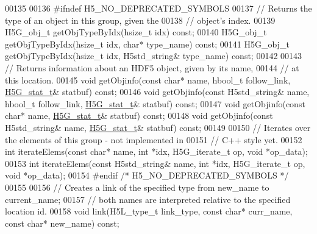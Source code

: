 \begin{DoxyCode}
00135 
00136 \textcolor{preprocessor}{#ifndef H5\_NO\_DEPRECATED\_SYMBOLS}
00137         \textcolor{comment}{// Returns the type of an object in this group, given the}
00138         \textcolor{comment}{// object's index.}
00139         H5G\_obj\_t getObjTypeByIdx(hsize\_t idx) \textcolor{keyword}{const};
00140         H5G\_obj\_t getObjTypeByIdx(hsize\_t idx, \textcolor{keywordtype}{char}* type\_name) \textcolor{keyword}{const};
00141         H5G\_obj\_t getObjTypeByIdx(hsize\_t idx, H5std\_string& type\_name) \textcolor{keyword}{const};
00142 
00143         \textcolor{comment}{// Returns information about an HDF5 object, given by its name,}
00144         \textcolor{comment}{// at this location.}
00145         \textcolor{keywordtype}{void} getObjinfo(\textcolor{keyword}{const} \textcolor{keywordtype}{char}* name, hbool\_t follow\_link, \hyperlink{struct_h5_g__stat__t}{H5G\_stat\_t}& statbuf) \textcolor{keyword}{const};
00146         \textcolor{keywordtype}{void} getObjinfo(\textcolor{keyword}{const} H5std\_string& name, hbool\_t follow\_link, 
      \hyperlink{struct_h5_g__stat__t}{H5G\_stat\_t}& statbuf) \textcolor{keyword}{const};
00147         \textcolor{keywordtype}{void} getObjinfo(\textcolor{keyword}{const} \textcolor{keywordtype}{char}* name, \hyperlink{struct_h5_g__stat__t}{H5G\_stat\_t}& statbuf) \textcolor{keyword}{const};
00148         \textcolor{keywordtype}{void} getObjinfo(\textcolor{keyword}{const} H5std\_string& name, \hyperlink{struct_h5_g__stat__t}{H5G\_stat\_t}& statbuf) \textcolor{keyword}{const};
00149 
00150         \textcolor{comment}{// Iterates over the elements of this group - not implemented in}
00151         \textcolor{comment}{// C++ style yet.}
00152         \textcolor{keywordtype}{int} iterateElems(\textcolor{keyword}{const} \textcolor{keywordtype}{char}* name, \textcolor{keywordtype}{int} *idx, H5G\_iterate\_t op, \textcolor{keywordtype}{void} *op\_data);
00153         \textcolor{keywordtype}{int} iterateElems(\textcolor{keyword}{const} H5std\_string& name, \textcolor{keywordtype}{int} *idx, H5G\_iterate\_t op, \textcolor{keywordtype}{void} *op\_data);
00154 \textcolor{preprocessor}{#endif }\textcolor{comment}{/* H5\_NO\_DEPRECATED\_SYMBOLS */}\textcolor{preprocessor}{}
00155 
00156         \textcolor{comment}{// Creates a link of the specified type from new\_name to current\_name;}
00157         \textcolor{comment}{// both names are interpreted relative to the specified location id.}
00158         \textcolor{keywordtype}{void} link(H5L\_type\_t link\_type, \textcolor{keyword}{const} \textcolor{keywordtype}{char}* curr\_name, \textcolor{keyword}{const} \textcolor{keywordtype}{char}* new\_name) \textcolor{keyword}{const};

\end{DoxyCode}
